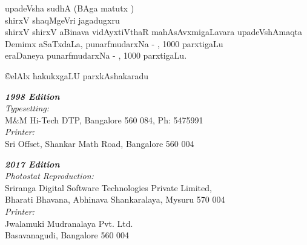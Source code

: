 \thispagestyle{empty}
\begin{center}
upadeVsha sudhA (BAga {} matutx {})\\
shirxV shaqMgeVri jagadugxru\\
shirxV shirxV aBinava vidAyxtiVthaR mahAsAvxmigaLavara upadeVshAmaqta\\
Demimx aSaTxdaLa, punarfmudarxNa - {, 1000} parxtigaLu\\ 
eraDaneya punarfmudarxNa - {, 1000} parxtigaLu. 
\end{center}
\vfill

\noindent
{\eng\copyright}elAlx hakukxgaLU parxkAshakaradu
\vfill


\noindent
\bgroup
{\sl\eng\bfseries 1998 Edition}\\
{\sl\eng Typesetting:}\\
{\eng M\&M Hi-Tech DTP, Bangalore 560 084, Ph: 5475991}\\
{\sl\eng Printer:}\\
{\eng Sri Offset, Shankar Math Road, Bangalore 560 004}
\bigskip

\noindent
{\sl\eng\bfseries 2017 Edition}\\
{\sl\eng Photostat Reproduction:}\\
{\eng Sriranga Digital Software Technologies Private Limited,\\ 
Bharati Bhavana, Abhinava Shankaralaya, Mysuru 570 004}\\
{\sl\eng Printer:}\\
{\eng Jwalamuki Mudranalaya Pvt. Ltd.\\
Basavanagudi, Bangalore 560 004}
